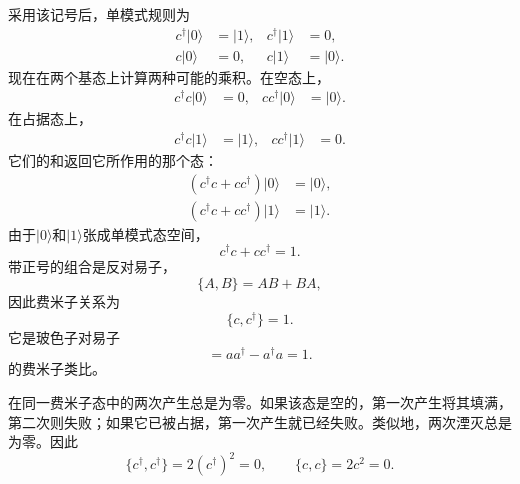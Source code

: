 \begin{classroomqa}
\end{classroomqa}

采用该记号后，单模式规则为
\begin{align}
c^\dagger|0\rangle&=|1\rangle,
&c^\dagger|1\rangle&=0,
\\
c|0\rangle&=0,
&c|1\rangle&=|0\rangle.
\end{align}
现在在两个基态上计算两种可能的乘积。在空态上，
\begin{align}
c^\dagger c|0\rangle&=0,
&
cc^\dagger|0\rangle&=|0\rangle.
\end{align}
在占据态上，
\begin{align}
c^\dagger c|1\rangle&=|1\rangle,
&
cc^\dagger|1\rangle&=0.
\end{align}
它们的和返回它所作用的那个态：
\begin{align}
(c^\dagger c+cc^\dagger)|0\rangle&=|0\rangle,
\\
(c^\dagger c+cc^\dagger)|1\rangle&=|1\rangle.
\end{align}
由于\(|0\rangle\)和\(|1\rangle\)张成单模式态空间，
\begin{equation}
c^\dagger c+cc^\dagger=1.
\end{equation}
带正号的组合是反对易子，
\begin{equation}
\{A,B\}=AB+BA,
\end{equation}
因此费米子关系为
\begin{equation}
\{c,c^\dagger\}=1.
\end{equation}
它是玻色子对易子
\begin{equation}
[a,a^\dagger]=aa^\dagger-a^\dagger a=1.
\end{equation}
的费米子类比。

在同一费米子态中的两次产生总是为零。如果该态是空的，第一次产生将其填满，第二次则失败；如果它已被占据，第一次产生就已经失败。类似地，两次湮灭总是为零。因此
\begin{equation}
\{c^\dagger,c^\dagger\}=2(c^\dagger)^2=0,
\qquad
\{c,c\}=2c^2=0.
\end{equation}

\begin{classroomqa}
\end{classroomqa}

